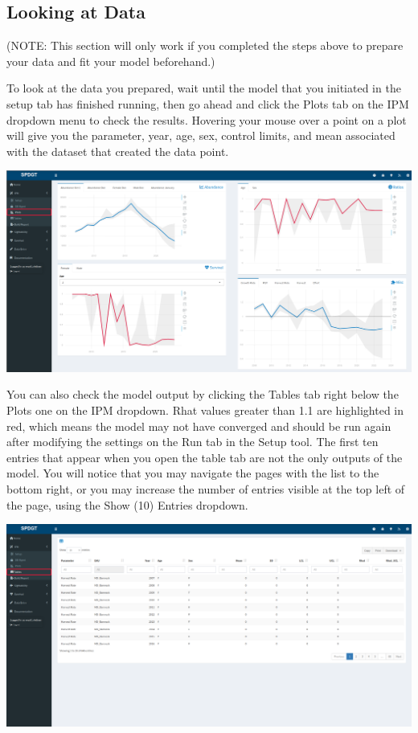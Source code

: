 \documentclass[
]{book}
\begin{document}
\hypertarget{ipm-look}{%
\subsection{Looking at Data}\label{ipm-look}}

(NOTE: This section will only work if you completed the steps above to prepare your data and fit your model beforehand.)

To look at the data you prepared, wait until the model that you initiated in the setup tab has finished running, then go ahead and click the Plots tab on the IPM dropdown menu to check the results. Hovering your mouse over a point on a plot will give you the parameter, year, age, sex, control limits, and mean associated with the dataset that created the data point.

\includegraphics{./www/ipm_walk7.png}

You can also check the model output by clicking the Tables tab right below the Plots one on the IPM dropdown. Rhat values greater than 1.1 are highlighted in red, which means the model may not have converged and should be run again after modifying the settings on the Run tab in the Setup tool. The first ten entries that appear when you open the table tab are not the only outputs of the model. You will notice that you may navigate the pages with the list to the bottom right, or you may increase the number of entries visible at the top left of the page, using the {Show (10) Entries} dropdown.

\includegraphics{./www/ipm_walk8.png}
\end{document}
